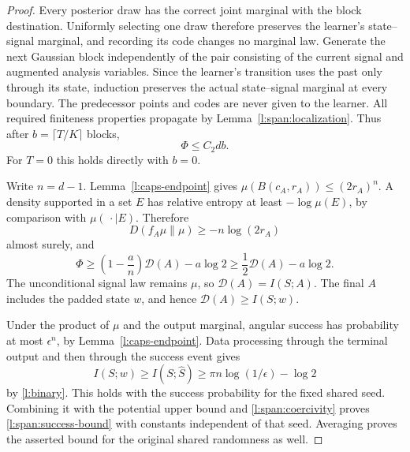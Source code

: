 \begin{proof}
Every posterior draw has the correct joint marginal with the block
destination.  Uniformly selecting one draw therefore preserves the
learner's state--signal marginal, and recording its code changes no
marginal law.  Generate the next Gaussian block independently of the
pair consisting of the current signal and augmented analysis
variables.  Since the learner's transition uses
the past only through its state, induction preserves the actual
state--signal marginal at every boundary.  The predecessor points
and codes are never given to the learner.  All required finiteness
properties propagate by Lemma~\ref{l:span:localization}.  Thus after
\(b=\lceil T/K\rceil\) blocks,
\[
 \Phi\le C_2db.
\]
For \(T=0\) this holds directly with \(b=0\).

Write \(n=d-1\).  Lemma~\ref{l:caps-endpoint} gives
\(\mu(B(c_A,r_A))\le(2r_A)^n\).  A density supported in a set \(E\)
has relative entropy at least \(-\log\mu(E)\), by comparison with
\(\mu(\,\cdot\mid E)\).  Therefore
\[
 D(f_A\mu\|\mu)\ge-n\log(2r_A)
\]
almost surely, and
\begin{equation}
 \Phi\ge\left(1-\frac an\right)\mathcal D(A)-a\log2
       \ge\frac12\mathcal D(A)-a\log2.
 \label{l:span:coercivity}
\end{equation}
The unconditional signal law remains \(\mu\), so
\(\mathcal D(A)=I(S;A)\).  The final \(A\) includes the padded state
\(w\), and hence \(\mathcal D(A)\ge I(S;w)\).

Under the product of \(\mu\) and the output marginal, angular
success has probability at most \(\epsilon^n\), by
Lemma~\ref{l:caps-endpoint}.  Data processing through the terminal
output and then through the success event gives
\[
 I(S;w)\ge I(S;\widehat S)
       \ge \pi n\log(1/\epsilon)-\log2
\]
by \eqref{l:binary}.  This holds with the success probability for
the fixed shared seed.  Combining it with the potential upper bound
and \eqref{l:span:coercivity} proves
\eqref{l:span:success-bound} with constants independent of that
seed.  Averaging proves the asserted bound for the original shared
randomness as well.
\end{proof}

